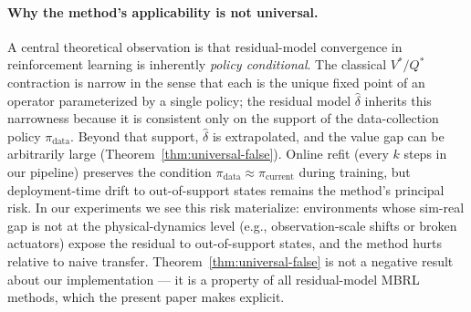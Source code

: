 \documentclass{article}
\theoremstyle{definition}
\newcommand{\pidata}{\pi_{\mathrm{data}}}
\begin{document}
\paragraph{Why the method's applicability is not universal.}
A central theoretical observation is that residual-model convergence in
reinforcement learning is inherently \emph{policy conditional}.  The
classical $V^*/Q^*$ contraction is narrow in the sense that each is the
unique fixed point of an operator parameterized by a single policy; the
residual model $\hat\delta$ inherits this narrowness because it is
consistent only on the support of the data-collection policy $\pidata$.
Beyond that support, $\hat\delta$ is extrapolated, and the value gap can
be arbitrarily large (Theorem~\ref{thm:universal-false}).  Online refit
(every $k$ steps in our pipeline) preserves the condition $\pidata \approx
\pi_{\mathrm{current}}$ during training, but deployment-time drift to
out-of-support states remains the method's principal risk.  In our
experiments we see this risk materialize: environments whose sim-real gap
is not at the physical-dynamics level (e.g., observation-scale shifts or
broken actuators) expose the residual to out-of-support states, and the
method hurts relative to naive transfer.  Theorem~\ref{thm:universal-false}
is not a negative result about our implementation --- it is a property of
all residual-model MBRL methods, which the present paper makes explicit.
\end{document}
